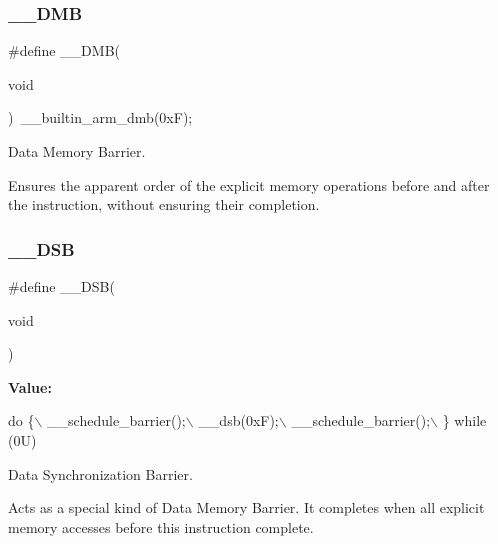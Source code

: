 \subsubsection{\texorpdfstring{\+\_\+\+\_\+\+D\+MB}{\_\_DMB}\hspace{0.1cm}{\footnotesize\ttfamily [2/2]}}
{\footnotesize\ttfamily \#define \+\_\+\+\_\+\+D\+MB(\begin{DoxyParamCaption}\item[{}]{void }\end{DoxyParamCaption})~\+\_\+\+\_\+builtin\+\_\+arm\+\_\+dmb(0x\+F);}



Data Memory Barrier. 

Ensures the apparent order of the explicit memory operations before and after the instruction, without ensuring their completion. \mbox{\label{group___c_m_s_i_s___core___instruction_interface_ga067d257a2b34565410acefb5afef2203}} 
\subsubsection{\texorpdfstring{\+\_\+\+\_\+\+D\+SB}{\_\_DSB}\hspace{0.1cm}{\footnotesize\ttfamily [1/2]}}
{\footnotesize\ttfamily \#define \+\_\+\+\_\+\+D\+SB(\begin{DoxyParamCaption}\item[{}]{void }\end{DoxyParamCaption})}

{\bfseries Value\+:}
\begin{DoxyCode}
\textcolor{keywordflow}{do} \{\(\backslash\)
                   \_\_schedule\_barrier();\(\backslash\)
                   \_\_dsb(0xF);\(\backslash\)
                   \_\_schedule\_barrier();\(\backslash\)
                \} \textcolor{keywordflow}{while} (0U)
\end{DoxyCode}


Data Synchronization Barrier. 

Acts as a special kind of Data Memory Barrier. It completes when all explicit memory accesses before this instruction complete. \mbox{\label{group___c_m_s_i_s___core___instruction_interface_ga067d257a2b34565410acefb5afef2203}} 
